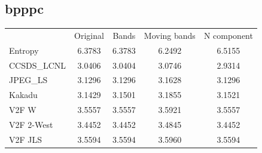 \documentclass{article}
\begin{document}
\subsection*{bpppc}
\begin{table}[h]
\begin{tabular}{lcccc}
\rowcolor[HTML]{C0C0C0} 
 & Original & Bands & Moving bands & N component \\
\cellcolor[HTML]{C0C0C0}Entropy & \cellcolor[HTML]{E0E0E0} 6.3783&  \cellcolor[HTML]{E0E0E0} 6.3783&  \cellcolor[HTML]{E0E0E0} 6.2492&  \cellcolor[HTML]{E0E0E0} 6.5155\\
\cellcolor[HTML]{C0C0C0}CCSDS\_LCNL & 3.0406 & 3.0404 & 3.0746 & \cellcolor[HTML]{DAE8FC}2.9314  \\
\cellcolor[HTML]{C0C0C0}JPEG\_LS    & \cellcolor[HTML]{DAE8FC}3.1296 & \cellcolor[HTML]{DAE8FC}3.1296 & 3.1628 & \cellcolor[HTML]{DAE8FC}3.1296  \\
\cellcolor[HTML]{C0C0C0}Kakadu      & \cellcolor[HTML]{DAE8FC}3.1429 & 3.1501 & 3.1855 & 3.1521  \\
\cellcolor[HTML]{C0C0C0}V2F W       & \cellcolor[HTML]{DAE8FC}3.5557 & \cellcolor[HTML]{DAE8FC}3.5557 & 3.5921 & \cellcolor[HTML]{DAE8FC}3.5557  \\
\cellcolor[HTML]{C0C0C0}V2F 2-West  & \cellcolor[HTML]{DAE8FC}3.4452 & \cellcolor[HTML]{DAE8FC}3.4452 & 3.4845 & \cellcolor[HTML]{DAE8FC}3.4452  \\
\cellcolor[HTML]{C0C0C0}V2F JLS     & \cellcolor[HTML]{DAE8FC}3.5594 & \cellcolor[HTML]{DAE8FC}3.5594 & 3.5960 & \cellcolor[HTML]{DAE8FC}3.5594  \\
\end{tabular}
\end{table}
\end{document}
